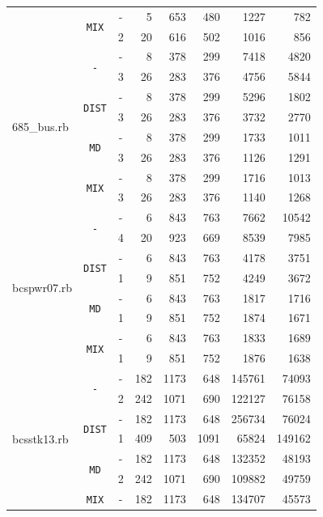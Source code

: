 \documentclass[11pt,american,czech,oneside]{book}
\theoremstyle{plain}
\theoremstyle{definition}
\begin{document}
{\begin{tabular}{|l|c|c|r|r|r|r|r|}
	& \multirow{2}{*}{\texttt{MIX}}
  	& -	& 5	  & 653 & 480 &	1227	&	782 \\
	& & 2	&	20	&	616	&	502	&	1016	&	856	\\
\hline
\multirow{8}{*}{685\_bus.rb}
	& \multirow{2}{*}{\texttt{-}}
  	& -	&  8	& 378 & 299 & 7418	&	4820	\\
	& & 3	&	26	&	283	&	376	&	4756	&	5844	\\
	& \multirow{2}{*}{\texttt{DIST}}
  	& -	&  8	& 378 & 299 & 5296	&	1802	\\
	& & 3	&	26	&	283	&	376	&	3732	&	2770	\\
	& \multirow{2}{*}{\texttt{MD}}
  	& -	&  8	& 378 & 299 & 1733	&	1011	\\
	& & 3	&	26	&	283	&	376	&	1126	&	1291	\\
	& \multirow{2}{*}{\texttt{MIX}}
  	& -	&  8	& 378 & 299 & 1716	&	1013	\\
	& & 3	&	26	&	283	&	376	&	1140	&	1268	\\
\hline
\multirow{8}{*}{bcspwr07.rb}
	& \multirow{2}{*}{\texttt{-}}
  	& -	  & 6	& 843 & 763 & 7662	&	10542	\\
	& & 4	&	20	&	923	&	669	&	8539	&	7985	\\
	& \multirow{2}{*}{\texttt{DIST}}
  	& -	  & 6	& 843 & 763 & 4178	&	3751	\\
	& & 1 	&	9	&	851	&	752	&	4249	&	3672	\\
	& \multirow{2}{*}{\texttt{MD}}
  	& -	  & 6	& 843 & 763 & 1817	&	1716	\\
	& & 1 	&	9	&	851	&	752	&	1874	&	1671	\\
	& \multirow{2}{*}{\texttt{MIX}}
  	& -	  & 6	& 843 & 763 & 1833	&	1689	\\
	& & 1 	&	9	&	851	&	752	&	1876	&	1638	\\
\hline
\multirow{8}{*}{bcsstk13.rb}
	& \multirow{2}{*}{\texttt{-}}
  	& -	& 182	& 1173  & 648 & 145761	&	74093	\\
	& & 2	&	242	&	1071	&	690	&	122127	&	76158	\\
	& \multirow{2}{*}{\texttt{DIST}}
  	& -	& 182	& 1173  & 648  & 256734	&	76024	\\
	& & 1 &	409	&	503	  &	1091 &	65824	&	149162	\\
	& \multirow{2}{*}{\texttt{MD}}
  	& -	& 182	& 1173  & 648 & 132352	&	48193	\\
	& & 2	&	242	&	1071	&	690	&	109882	&	49759	\\
	& \multirow{2}{*}{\texttt{MIX}}
  	& -	& 182	& 1173  & 648  & 134707	&	45573	\\

\end{tabular}}
\end{document}
